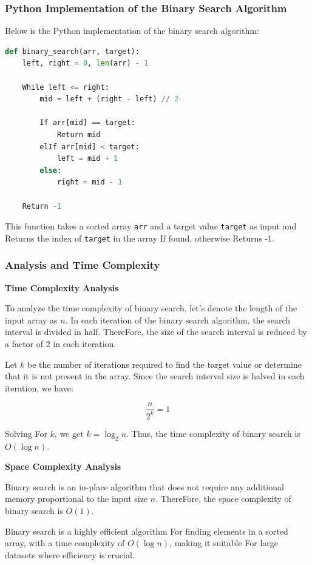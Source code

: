 \documentclass[12pt]{book} %
\begin{document}
\subsubsection{Python Implementation of the Binary Search Algorithm}
Below is the Python implementation of the binary search algorithm:

\begin{lstlisting}[language=Python]
def binary_search(arr, target):
    left, right = 0, len(arr) - 1
    
    While left <= right:
        mid = left + (right - left) // 2
        
        If arr[mid] == target:
            Return mid
        elIf arr[mid] < target:
            left = mid + 1
        else:
            right = mid - 1
    
    Return -1
\end{lstlisting}

This function takes a sorted array \texttt{arr} and a target value \texttt{target} as input and Returns the index of \texttt{target} in the array If found, otherwise Returns -1.
\subsubsection{Analysis and Time Complexity}
\textbf{Time Complexity Analysis}

To analyze the time complexity of binary search, let's denote the length of the input array as \(n\). In each iteration of the binary search algorithm, the search interval is divided in half. ThereFore, the size of the search interval is reduced by a factor of 2 in each iteration.

Let \(k\) be the number of iterations required to find the target value or determine that it is not present in the array. Since the search interval size is halved in each iteration, we have:

\[
\frac{n}{2^k} = 1
\]

Solving For \(k\), we get \(k = \log_2 n\). Thus, the time complexity of binary search is \(O(\log n)\).

\textbf{Space Complexity Analysis}

Binary search is an in-place algorithm that does not require any additional memory proportional to the input size \(n\). ThereFore, the space complexity of binary search is \(O(1)\).

Binary search is a highly efficient algorithm For finding elements in a sorted array, with a time complexity of \(O(\log n)\), making it suitable For large datasets where efficiency is crucial.
\end{document}
